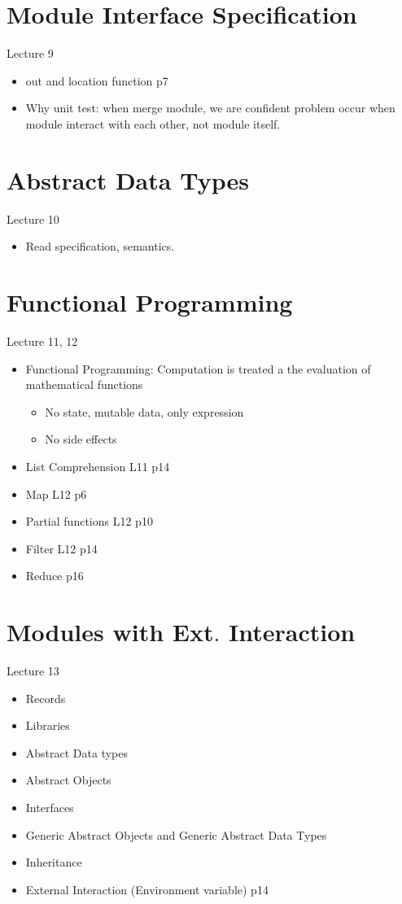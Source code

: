\documentclass[12pt]{article}
\begin{document}
\section{Module Interface Specification}
Lecture 9
\begin{itemize}
    \item out and location function p7
    \item Why unit test: when merge module, we are confident problem occur when module interact with each other, 
    not module itself.
\end{itemize}

\section{Abstract Data Types}
Lecture 10
\begin{itemize}
    \item Read specification, semantics.
\end{itemize}

\section{Functional Programming}
Lecture 11, 12
\begin{itemize}
    \item Functional Programming: Computation is treated a the evaluation of mathematical functions
    \begin{itemize}
        \item No state, mutable data, only expression
        \item No side effects
    \end{itemize}
    \item List Comprehension L11 p14
    \item Map L12 p6
    \item Partial functions L12 p10
    \item Filter L12 p14
    \item Reduce p16
\end{itemize}

\section{Modules with Ext$.$ Interaction}
Lecture 13
\begin{itemize}
    \item Records
    \item Libraries
    \item Abstract Data types
    \item Abstract Objects
    \item Interfaces
    \item Generic Abstract Objects and Generic Abstract Data Types
    \item Inheritance
    \item External Interaction (Environment variable) p14
\end{itemize}
\end{document}

